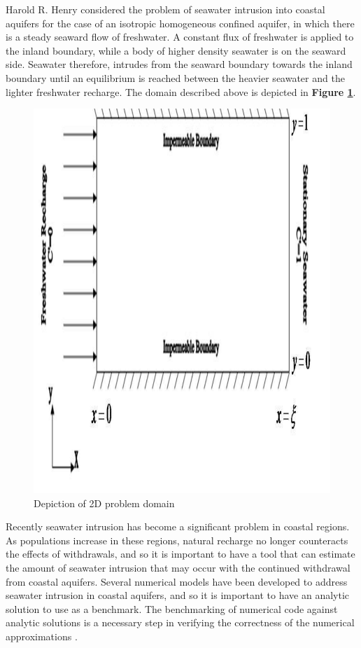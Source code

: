 Harold R. Henry \cite{Henry60} \cite{Henry64} considered the problem of seawater intrusion into
coastal aquifers for the case of an isotropic homogeneous confined aquifer, in which there is a
steady seaward flow of freshwater. A constant flux of freshwater is applied to the inland boundary,
while a body of higher density seawater is on the seaward side. Seawater therefore, intrudes from
the seaward boundary towards the inland boundary until an equilibrium is reached between the heavier
seawater and the lighter freshwater recharge. The domain described above is depicted in
\textbf{Figure \ref{fig:Domain}}.

\begin{figure}[htp]
    \centering
    \includegraphics[scale=0.25]
    {image1}
    \caption{Depiction of 2D problem domain} \label{fig:Domain}
\end{figure}

Recently seawater intrusion has become a significant problem in coastal regions.  As populations
increase in these regions, natural recharge no longer counteracts the effects of withdrawals, and so
it is important to have a tool that can estimate the amount of seawater intrusion that may occur
with the continued withdrawal from coastal aquifers. Several numerical models have been developed to
address seawater intrusion in coastal aquifers, and so it is important to have an analytic solution
to use as a benchmark. The benchmarking of numerical code against analytic solutions is a necessary
step in verifying the correctness of the numerical approximations \cite{Simpson}.

